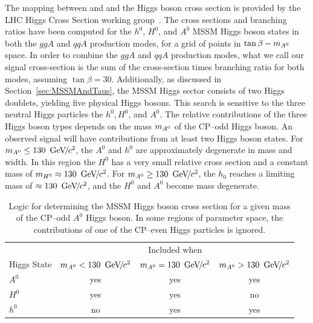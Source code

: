 The mapping between \ma and \tb and the Higgs boson cross section is provided by the
LHC Higgs Cross Section working group~\cite{LHC-HCWG}.  The cross sections and
branching ratios have been computed for the $h^0$, $H^0$, and $A^0$ MSSM Higgs
boson states in both the $ggA$ and $qqA$ production modes, for a grid of points in
$\mbox{\ensuremath{\tan\beta}}-m_{A^0}$ space.  In order to combine the $ggA$ and $qqA$ production modes, what
we call our signal cross-section is the sum of the cross-section times branching
ratio for both modes, assuming \mbox{$\tan\beta = 30$}.  Additionally, as
discussed in Section~\ref{sec:MSSMAndTaus}, the MSSM Higgs sector consists of
two Higgs doublets, yielding five physical Higgs bosons.  This search is
sensitive to the three neutral Higgs particles the $h^0, H^0$, and $A^0$.  The
relative contributions of the three Higgs boson types depends on the mass $\ma$ of the
CP--odd Higgs boson.  An observed signal will have contributions from at least two
Higgs boson states.   For $m_{A^0} \leq 130~{\,\text{Ge\hspace{-.08em}V\hspace{-0.16em}/\hspace{-0.08em}}c^\text{2}}$, the $A^0$ and $h^0$ are approximately
degenerate in mass and width.  In this region the $H^0$ has a very small
relative cross section and a constant mass of $m_{H^0} \approx 130~{\,\text{Ge\hspace{-.08em}V\hspace{-0.16em}/\hspace{-0.08em}}c^\text{2}}$.  For
$m_{A^0} \geq 130~{\,\text{Ge\hspace{-.08em}V\hspace{-0.16em}/\hspace{-0.08em}}c^\text{2}}$, the $h_0$ reaches a limiting mass of $\approx
130~{\,\text{Ge\hspace{-.08em}V\hspace{-0.16em}/\hspace{-0.08em}}c^\text{2}}$, and the $H^0$ and $A^0$ become mass degenerate.   
%
\begin{table}
  \centering
  \begin{tabular}{l|ccc} 
                & \multicolumn{3}{c}{Included when} \\
    Higgs State & $m_{A^0} < 130~{\,\text{Ge\hspace{-.08em}V\hspace{-0.16em}/\hspace{-0.08em}}c^\text{2}}$ & $m_{A^0} = 130~{\,\text{Ge\hspace{-.08em}V\hspace{-0.16em}/\hspace{-0.08em}}c^\text{2}}$ & $m_{A^0} > 130~{\,\text{Ge\hspace{-.08em}V\hspace{-0.16em}/\hspace{-0.08em}}c^\text{2}}$ \\
    \hline
    $A^0$       & yes & yes & yes \\
    $H^0$       & yes & yes & no \\
    $h^0$       & no & yes & yes \\
  \end{tabular}
  \caption[Contributions of different MSSM Higgs boson types at different
  $\ma$.]{Logic for determining the MSSM Higgs boson cross section for a given mass of
  the CP--odd $A^0$ Higgs boson.  In some regions of parameter space, the
  contributions of one of the CP--even Higgs particles is ignored.}
  \label{tab:HiggsXSectionCombination}
\end{table}

